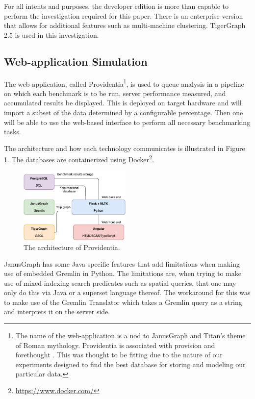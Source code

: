 For all intents and purposes, the developer edition is more than capable to perform the investigation required for this paper. There is an enterprise version that allows for additional features such as multi-machine clustering. TigerGraph 2.5 is used in this investigation.

\subsection{Web-application Simulation}

The web-application, called Providentia\footnote{The name of the web-application is a nod to JanusGraph and Titan's theme of Roman mythology. Providentia is associated with provision and forethought \cite{providentiaMeaning}. This was thought to be fitting due to the nature of our experiments designed to find the best database for storing and modeling our particular data.}, is used to queue analysis in a pipeline on which each benchmark is to be run, server performance measured, and accumulated results be displayed. This is deployed on target hardware and will import a subset of the data determined by a configurable percentage. Then one will be able to use the web-based interface to perform all necessary benchmarking tasks.

The architecture and how each technology communicates is illustrated in Figure \ref{fig:providentiaArchitecture}. The databases are containerized using Docker\footnote{\url{https://www.docker.com/}}.

\begin{figure}[h]
    \centering
    \includegraphics[width=0.49\textwidth]{img/5_designFigures/providentiaArchitecture.pdf}
    \caption{The architecture of Providentia.}
    \label{fig:providentiaArchitecture}
\end{figure}

JanusGraph has some Java specific features that add limitations when making use of embedded Gremlin in Python. The limitations are, when trying to make use of mixed indexing search predicates such as spatial queries, that one may only do this via Java or a superset language thereof. The workaround for this was to make use of the Gremlin Translator which takes a Gremlin query as a string and interprets it on the server side.

